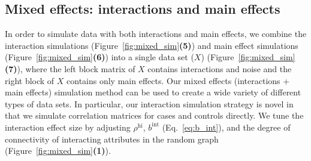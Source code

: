 \documentclass[10pt,letterpaper]{article}
\begin{document}
\subsection{Mixed effects: interactions and main effects}
In order to simulate data with both interactions and main effects, we combine the interaction simulations (Figure~\ref{fig:mixed_sim}\textbf{(5)}) and main effect simulations (Figure~\ref{fig:mixed_sim}\textbf{(6)}) into a single data set ($X$) (Figure~\ref{fig:mixed_sim}\textbf{(7)}), where the left block matrix of $X$ contains interactions and noise and the right block of $X$ contains only main effects. Our mixed effects (interactions + main effects) simulation method can be used to create a wide variety of different types of data sets. In particular, our interaction simulation strategy is novel in that we simulate correlation matrices for cases and controls directly. We tune the interaction effect size by adjusting $\rho^\text{hi}$, $b^\text{int}$ (Eq.~\ref{eq:b_int}), and the degree of connectivity of interacting attributes in the random graph (Figure~\ref{fig:mixed_sim}\textbf{(1)}).
\end{document}
